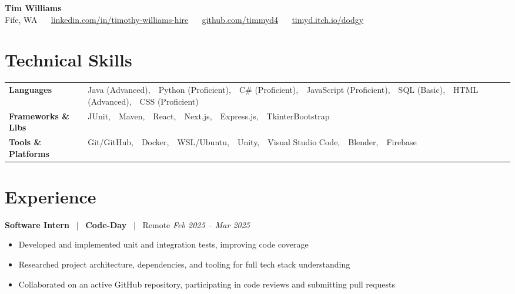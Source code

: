 \documentclass[10pt, letterpaper]{article}
\newcommand{\jobhead}[4]{%
  \vspace{5pt}%
  {\bfseries\color{dark}#1}%
  ~{\color{light}|}~%
  {\bfseries\color{navy}#2}%
  ~{\color{light}|}~%
  {\color{light}#3}%
  \hfill{\color{light}\small\textit{#4}}\\[-2pt]%
}
\newcommand{\skillrow}[2]{%
  {\bfseries #1} & #2 \\[2pt]%
}
\begin{document}

\begin{center}
  {\huge\bfseries\color{navy} Tim Williams}\\[4pt]
  {\small\color{light}
    Fife, WA
    ~\textbullet~
    \href{https://linkedin.com/in/timothy-williams-hire}{linkedin.com/in/timothy-williams-hire}
    ~\textbullet~
    \href{https://github.com/timmyd4}{github.com/timmyd4}
    ~\textbullet~
    \href{https://timyd.itch.io/dodgy}{timyd.itch.io/dodgy}
  }
\end{center}

\vspace{2pt}

\section{Technical Skills}

\begin{tabular}{@{}p{1.6in} p{5.2in}@{}}
  \skillrow{Languages}{Java (Advanced),\ \ Python (Proficient),\ \ C\# (Proficient),\ \ JavaScript (Proficient),\ \ SQL (Basic),\ \ HTML (Advanced),\ \ CSS (Proficient)}
  \skillrow{Frameworks \& Libs}{JUnit,\ \ Maven,\ \ React,\ \ Next.js,\ \ Express.js,\ \ TkinterBootstrap}
  \skillrow{Tools \& Platforms}{Git/GitHub,\ \ Docker,\ \ WSL/Ubuntu,\ \ Unity,\ \ Visual Studio Code,\ \ Blender,\ \ Firebase}
\end{tabular}

\section{Experience}

\jobhead{Software Intern}{Code-Day}{Remote}{Feb 2025 – Mar 2025}
\begin{itemize}
  \item Developed and implemented unit and integration tests, improving code coverage
  \item Researched project architecture, dependencies, and tooling for full tech stack understanding
  \item Collaborated on an active GitHub repository, participating in code reviews and submitting pull requests
\end{itemize}
\end{document}
